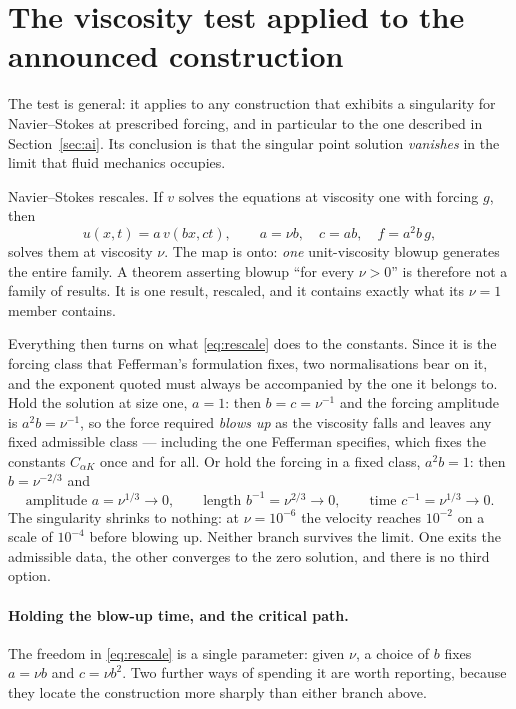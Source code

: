 \documentclass[11pt]{article}
\begin{document}
\section{The viscosity test applied to the announced construction}\label{app:nu}

The test is general: it applies to any construction that exhibits a singularity for Navier--Stokes at
prescribed forcing, and in particular to the one described in Section~\ref{sec:ai}. Its conclusion is
that the singular point solution \emph{vanishes} in the limit that fluid mechanics occupies.

Navier--Stokes rescales. If $v$ solves the equations at viscosity one with forcing $g$, then
\begin{equation}\label{eq:rescale}
u(x,t) = a\,v(bx,ct),\qquad a = \nu b,\quad c = ab,\quad f = a^2 b\,g,
\end{equation}
solves them at viscosity $\nu$. The map is onto: \emph{one} unit-viscosity blowup generates the
entire family. A theorem asserting blowup ``for every $\nu>0$'' is therefore not a family of results.
It is one result, rescaled, and it contains exactly what its $\nu=1$ member contains.

Everything then turns on what \eqref{eq:rescale} does to the constants. Since it is the forcing class
that Fefferman's formulation fixes, two normalisations bear on it, and the exponent quoted must always
be accompanied by the one it belongs to. Hold the solution at size one, $a=1$: then $b=c=\nu^{-1}$ and
the forcing amplitude is $a^2b=\nu^{-1}$, so the force required \emph{blows up} as the viscosity falls
and leaves any fixed admissible class --- including the one Fefferman specifies, which fixes the
constants $C_{\alpha K}$ once and for all. Or hold the forcing in a fixed class, $a^2b=1$: then
$b=\nu^{-2/3}$ and
\begin{equation}\label{eq:shrink}
\text{amplitude } a = \nu^{1/3}\to 0,\qquad
\text{length } b^{-1} = \nu^{2/3}\to 0,\qquad
\text{time } c^{-1} = \nu^{1/3}\to 0 .
\end{equation}
The singularity shrinks to nothing: at $\nu=10^{-6}$ the velocity reaches $10^{-2}$ on a scale of
$10^{-4}$ before blowing up. Neither branch survives the limit. One exits the admissible data, the
other converges to the zero solution, and there is no third option.

\paragraph{Holding the blow-up time, and the critical path.} The freedom in \eqref{eq:rescale} is a
single parameter: given $\nu$, a choice of $b$ fixes $a=\nu b$ and $c=\nu b^2$. Two further ways of
spending it are worth reporting, because they locate the construction more sharply than either
branch above.
\end{document}

